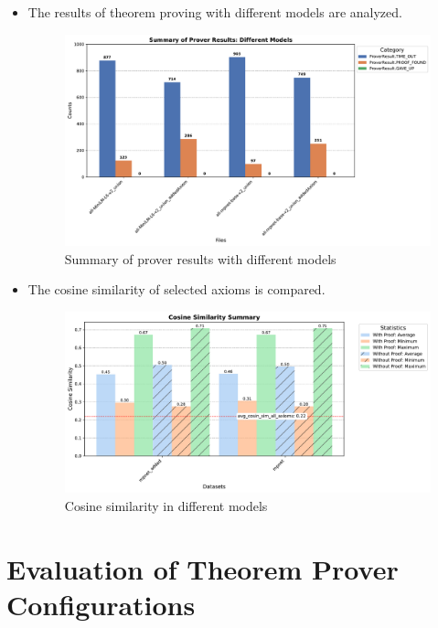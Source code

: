 \documentclass[english,version-2020-11]{uzl-thesis}
\begin{document}
\begin{itemize}
    \item The results of theorem proving with different models are analyzed.
    \begin{figure}[h!]
        \centering
        \includegraphics[width=\textwidth]{different_mode_output.pdf}
        \caption{Summary of prover results with different models}
        \label{fig:results_different_models}
    \end{figure}        
    \FloatBarrier

    \item The cosine similarity of selected axioms is compared.
    \begin{figure}[h!]
        \centering
        \includegraphics[width=\textwidth]{cosine_similarity_mpnet_summary.pdf}
        \caption{Cosine similarity in different models}
        \label{fig:cosine_similarity_mpnet}
    \end{figure}
    \FloatBarrier
\end{itemize}


\section{Evaluation of Theorem Prover Configurations}
\end{document}
